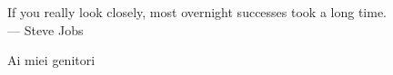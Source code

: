 \cleardoublepage
{}
\thispagestyle{empty}

\vspace*{3cm}

\begin{center}
    If you really look closely, most overnight successes took a long time. \\ \medskip
    --- Steve Jobs
\end{center}

\medskip

\begin{center}
    Ai miei genitori
\end{center}
